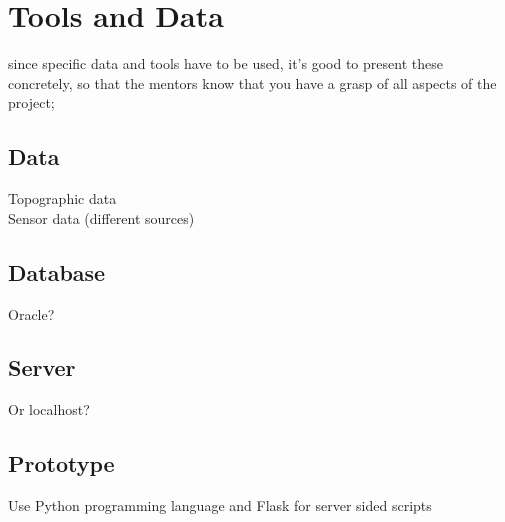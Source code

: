 \chapter{Tools and Data}
\label{chap:TD}

since specific data and tools have to be used, it’s good to present these concretely, so that the mentors know that you have a grasp of all aspects of the project;


\section{Data}
Topographic data\\
Sensor data (different sources)

\section{Database}
Oracle?

\section{Server}
Or localhost?

\section{Prototype}
Use Python programming language and Flask for server sided scripts